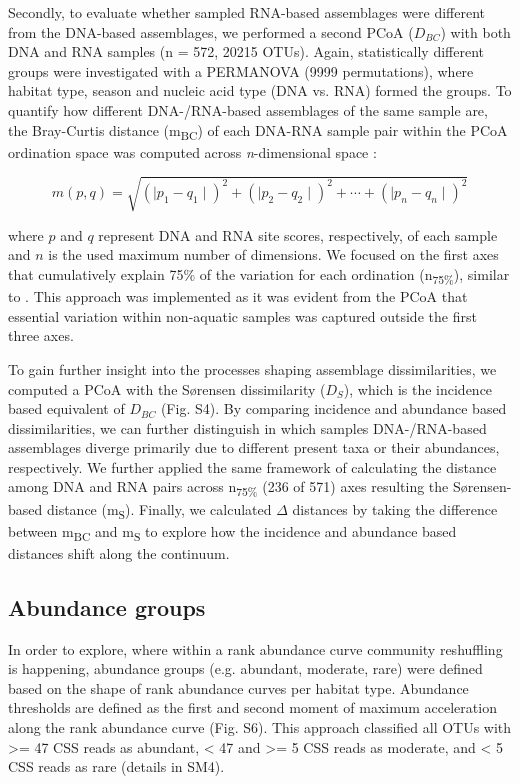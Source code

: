 \documentclass[12pt,a4paper]{article} %
\begin{document}
Secondly, to evaluate whether sampled RNA-based assemblages were different from the DNA-based assemblages, we performed a second PCoA ($D_{BC}$) with both DNA and RNA samples (n = 572, 20215 OTUs). Again, statistically different groups were investigated with a PERMANOVA (9999 permutations), where habitat type, season and nucleic acid type (DNA vs. RNA) formed the groups. To quantify how different DNA-/RNA-based assemblages of the same sample are, the Bray-Curtis distance (m\textsubscript{BC}) of each DNA-RNA sample pair within the PCoA ordination space was computed across \textit{n}-dimensional space \citep{Tabak2004}:


\[ m(p,q) = \sqrt{(\mid p_{1} - q_{1} \mid)^2 + (\mid p_{2} - q_{2} \mid)^2 + \cdots + (\mid p_{n} - q_{n} \mid)^2}\]


where $p$ and $q$ represent DNA and RNA site scores, respectively, of each sample and $n$ is the used maximum number of dimensions. We focused on the first axes that cumulatively explain 75\% of the variation for each ordination (n\textsubscript{75\%}), similar to \citet{Osterholz2016}. This approach was implemented as it was evident from the PCoA that essential variation within non-aquatic samples was captured outside the first three axes.

To gain further insight into the processes shaping assemblage dissimilarities, we computed a PCoA with the S{\o}rensen dissimilarity ($D_{S}$), which is the incidence based equivalent of $D_{BC}$ \citep{Legendre1998, Sorensen1948}(Fig. S4). By comparing incidence and abundance based dissimilarities, we can further distinguish in which samples DNA-/RNA-based assemblages diverge primarily due to different present taxa or their abundances, respectively. We further applied the same framework of calculating the distance among DNA and RNA pairs across n\textsubscript{75\%} (236 of 571) axes resulting the S{\o}rensen-based distance (m\textsubscript{S}). Finally, we calculated $\Delta$ distances by taking the difference between m\textsubscript{BC} and m\textsubscript{S} to explore how the incidence and abundance based distances shift along the continuum.

\subsection*{Abundance groups}
In order to explore, where within a rank abundance curve community reshuffling is happening, abundance groups (e.g. abundant, moderate, rare) were defined based on the shape of rank abundance curves per habitat type. Abundance thresholds are defined as the first and second moment of maximum acceleration along the rank abundance curve (Fig. S6). This approach classified all OTUs with >= 47 CSS reads as abundant, < 47 and >= 5 CSS reads as moderate, and < 5 CSS reads as rare (details in SM4).
\end{document}
